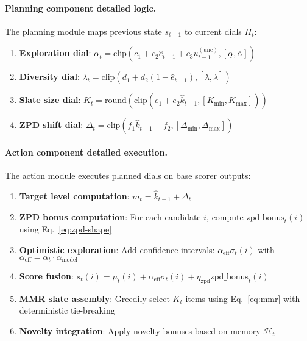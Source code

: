\paragraph{Planning component detailed logic.} The planning module maps previous state $s_{t-1}$ to current dials $\Pi_t$:
\begin{enumerate}
  \item \textbf{Exploration dial}: $\alpha_t = \text{clip}(c_1 + c_2 \widehat{e}_{t-1} + c_3 u_{t-1}^{(\mathrm{unc})}, [\underline{\alpha}, \overline{\alpha}])$
  \item \textbf{Diversity dial}: $\lambda_t = \text{clip}(d_1 + d_2 (1 - \widehat{e}_{t-1}), [\underline{\lambda}, \overline{\lambda}])$
  \item \textbf{Slate size dial}: $K_t = \text{round}(\text{clip}(e_1 + e_2 \widehat{k}_{t-1}, [K_{\min}, K_{\max}]))$
  \item \textbf{ZPD shift dial}: $\Delta_t = \text{clip}(f_1 \widehat{k}_{t-1} + f_2, [\Delta_{\min}, \Delta_{\max}])$
\end{enumerate}

\paragraph{Action component detailed execution.} The action module executes planned dials on base scorer outputs:
\begin{enumerate}
  \item \textbf{Target level computation}: $m_t = \widehat{k}_{t-1} + \Delta_t$
  \item \textbf{ZPD bonus computation}: For each candidate $i$, compute $\text{zpd\_bonus}_t(i)$ using Eq.~\eqref{eq:zpd-shape}
  \item \textbf{Optimistic exploration}: Add confidence intervals: $\alpha_{\mathrm{eff}} \sigma_t(i)$ with $\alpha_{\mathrm{eff}} = \alpha_t \cdot \alpha_{\text{model}}$
  \item \textbf{Score fusion}: $s_t(i) = \mu_t(i) + \alpha_{\mathrm{eff}}\sigma_t(i) + \eta_{\mathrm{zpd}}\text{zpd\_bonus}_t(i)$
  \item \textbf{MMR slate assembly}: Greedily select $K_t$ items using Eq.~\eqref{eq:mmr} with deterministic tie-breaking
  \item \textbf{Novelty integration}: Apply novelty bonuses based on memory $\mathcal{H}_t$
\end{enumerate}

